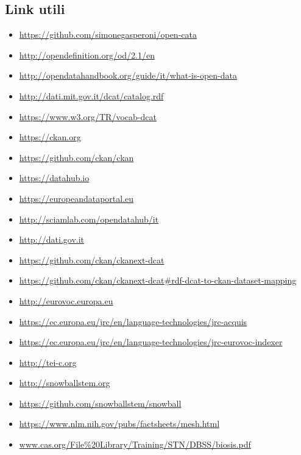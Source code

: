 \documentclass{article}
\theoremstyle{plain}
\theoremstyle{definition}
\begin{document}
\subsection{Link utili}
\begin{itemize}
\item \url{https://github.com/simonegasperoni/open-cata}
\item \url{http://opendefinition.org/od/2.1/en}
\item \url{http://opendatahandbook.org/guide/it/what-is-open-data}
\item \url{http://dati.mit.gov.it/dcat/catalog.rdf}
\item \url{https://www.w3.org/TR/vocab-dcat}
\item \url{https://ckan.org}
\item \url{https://github.com/ckan/ckan}
\item \url{https://datahub.io}
\item \url{https://europeandataportal.eu}
\item \url{http://sciamlab.com/opendatahub/it}
\item \url{http://dati.gov.it}
\item \url{https://github.com/ckan/ckanext-dcat}
\item \url{https://github.com/ckan/ckanext-dcat#rdf-dcat-to-ckan-dataset-mapping}
\item \url{http://eurovoc.europa.eu}
\item \url{https://ec.europa.eu/jrc/en/language-technologies/jrc-acquis}
\item \url{https://ec.europa.eu/jrc/en/language-technologies/jrc-eurovoc-indexer}
\item \url{http://tei-c.org}
\item \url{http://snowballstem.org}
\item \url{https://github.com/snowballstem/snowball}
\item \url{https://www.nlm.nih.gov/pubs/factsheets/mesh.html}
\item \url{www.cas.org/File%20Library/Training/STN/DBSS/biosis.pdf}
\end{itemize}
\end{document}
